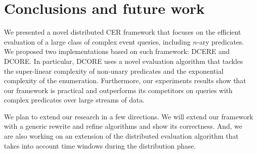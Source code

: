 \chapter{Conclusions and future work}\label{chapter:conclusion}

We presented a novel distributed CER framework that focuses on the efficient evaluation of a large class of complex event queries, including $n$-ary predicates. We proposed two implementations based on such framework: DCERE and DCORE. In particular, DCORE uses a novel evaluation algorithm that tackles the super-linear complexity of non-unary predicates and the exponential complexity of the enumeration. Furthermore, our experiments results show that our framework is practical and outperforms its competitors on queries with complex predicates over large streams of data.

We plan to extend our research in a few directions. We will extend our framework with a generic rewrite and refine algorithms and show its correctness. And, we are also working on an extension of the distributed evaluation algorithm that takes into account time windows during the distribution phase.
